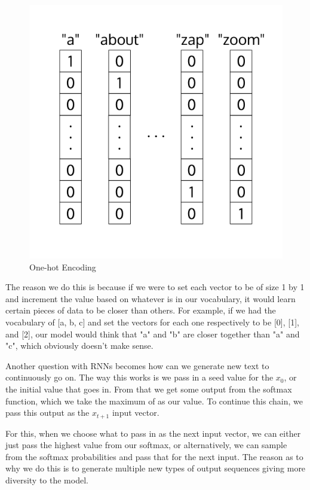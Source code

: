 \documentclass{article}
\begin{document}
\begin{figure}[H]
\centering
\includegraphics[scale=0.4]{one-hot-encode.png}
\caption{One-hot Encoding}
\label{fig:one-hot_encode}
\end{figure}

The reason we do this is because if we were to set each vector to be of size 1 by 1 and increment the value based on whatever is in our vocabulary, it would learn certain pieces of data to be closer than others. For example, if we had the vocabulary of [a, b, c] and set the vectors for each one respectively to be [0], [1], and [2], our model would think that "a" and "b" are closer together than "a" and "c", which obviously doesn't make sense.

Another question with RNNs becomes how can we generate new text to continuously go on. The way this works is we pass in a seed value for the $x_{0}$, or the initial value that goes in. From that we get some output from the softmax function, which we take the maximum of as our value. To continue this chain, we pass this output as the $x_{t+1}$ input vector.

For this, when we choose what to pass in as the next input vector, we can either just pass the highest value from our softmax, or alternatively, we can sample from the softmax probabilities and pass that for the next input. The reason as to why we do this is to generate multiple new types of output sequences giving more diversity to the model.
\end{document}
